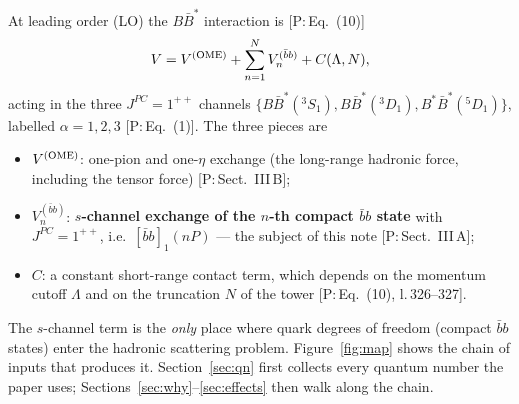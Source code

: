 \documentclass[11pt,a4paper]{article}
\newcommand{\tagP}[1]{\textcolor{blue!65!black}{\textsf{\small[P:\,#1]}}}
\newcommand{\BBst}{B\bar B^*}
\newcommand{\BstBst}{B^*\bar B^*}
\renewcommand{\VQQ}{V^{(\bar bb)}}
\renewcommand{\VOME}{V^{\rm (OME)}}
\renewcommand{\bbnP}{[\bar bb]_1(nP)}
\begin{document}
At leading order (LO) the $\BBst$ interaction is \tagP{Eq.~(10)}
\begin{equation}
V=\VOME+\sum_{n=1}^{N}\VQQ_n+C(\Lambda,N),
\label{eq:Vdef}
\end{equation}
acting in the three $J^{PC}=1^{++}$ channels $\{\BBst(^3S_1),\BBst(^3D_1),\BstBst(^5D_1)\}$, labelled $\alpha=1,2,3$ \tagP{Eq.~(1)}. The three pieces are
\begin{itemize}
\item $\VOME$: one-pion and one-$\eta$ exchange (the long-range hadronic force, including the tensor force) \tagP{Sect.~III\,B};
\item $\VQQ_n$: \textbf{$s$-channel exchange of the $n$-th compact $\bar bb$ state} with $J^{PC}=1^{++}$, i.e.\ $\bbnP$ --- the subject of this note \tagP{Sect.~III\,A};
\item $C$: a constant short-range contact term, which depends on the momentum cutoff $\Lambda$ and on the truncation $N$ of the tower \tagP{Eq.~(10), l.\,326--327}.
\end{itemize}
The $s$-channel term is the \emph{only} place where quark degrees of freedom (compact $\bar bb$ states) enter the hadronic scattering problem. Figure~\ref{fig:map} shows the chain of inputs that produces it. Section~\ref{sec:qn} first collects every quantum number the paper uses; Sections~\ref{sec:why}--\ref{sec:effects} then walk along the chain.
\end{document}
